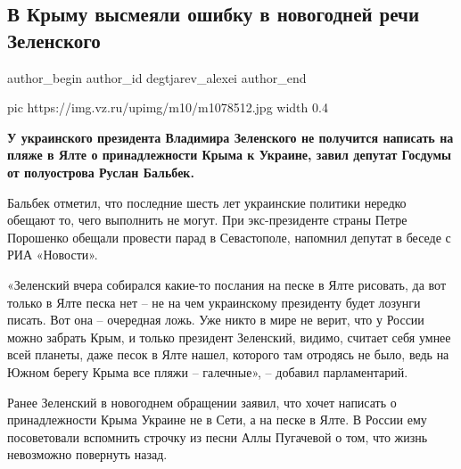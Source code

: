  
 
 
 
 
 
\subsection{В Крыму высмеяли ошибку в новогодней речи Зеленского}
\label{sec:01_01_2021.news.ru.vz.degtjarev_alexei.1.krym_zelenskii_new_year}
\ifcmt
	author_begin
   author_id degtjarev_alexei
	author_end
\fi

\ifcmt
  pic https://img.vz.ru/upimg/m10/m1078512.jpg
  width 0.4
\fi

\textbf{У украинского президента Владимира Зеленского не получится написать на пляже в
Ялте о принадлежности Крыма к Украине, завил депутат Госдумы от полуострова
Руслан Бальбек.}

Бальбек отметил, что последние шесть лет украинские политики нередко обещают
то, чего выполнить не могут. При экс-президенте страны Петре Порошенко обещали
провести парад в Севастополе, напомнил депутат в беседе с РИА «Новости».

«Зеленский вчера собирался какие-то послания на песке в Ялте рисовать, да вот
только в Ялте песка нет – не на чем украинскому президенту будет лозунги
писать. Вот она – очередная ложь. Уже никто в мире не верит, что у России можно
забрать Крым, и только президент Зеленский, видимо, считает себя умнее всей
планеты, даже песок в Ялте нашел, которого там отродясь не было, ведь на Южном
берегу Крыма все пляжи – галечные», – добавил парламентарий.

Ранее Зеленский в новогоднем обращении заявил, что хочет написать о
принадлежности Крыма Украине не в Сети, а на песке в Ялте. В России ему
посоветовали вспомнить строчку из песни Аллы Пугачевой о том, что жизнь
невозможно повернуть назад. 

